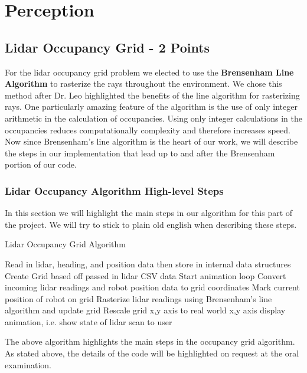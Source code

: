 \documentclass{article}
\numberwithin{equation}{section} %
\numberwithin{figure}{section} %
\numberwithin{table}{section} %
\begin{document}
\section{Perception}

\begin{framed}
\subsection{Lidar Occupancy Grid - 2 Points}
\label{sec:Perception}


For the lidar occupancy grid problem we elected to use the \textbf{Brensenham Line Algorithm} to rasterize the rays throughout the environment.  We chose this method after Dr. Leo highlighted the benefits of the line algorithm for rasterizing rays.  One particularly amazing feature of the algorithm is the use of only integer arithmetic in the calculation of occupancies.  Using only integer calculations in the occupancies reduces computationally complexity and therefore increases speed. Now since Brensenham's line algorithm is the heart of our work, we will describe the steps in our implementation that lead up to and after the Brensenham portion of our code.

\subsubsection{Lidar Occupancy Algorithm High-level Steps}
In this section we will highlight the main steps in our algorithm for this part of the project. We will try to stick to plain old english when describing these steps.

 
\begin{algorithm}[H]
\caption{Lidar Occupancy Grid Algorithm}\label{alg:cap}
\begin{algorithmic}[1] %
\State Read in lidar, heading, and position data then store in internal data structures
\State Create Grid based off passed in lidar CSV data 
\State Start animation loop
\State Convert incoming lidar readings and robot position data to grid coordinates
\State Mark current position of robot on grid 
\State Rasterize lidar readings using Brensenham's line algorithm and update grid
\State Rescale grid x,y axis to real world x,y axis
\State display animation, i.e. show state of lidar scan to user
\EndWhile
\end{algorithmic}
\end{algorithm}

The above algorithm highlights the main steps in the occupancy grid algorithm.  As stated above, the details of the code will be highlighted on request at the oral examination.


\end{framed}
\end{document}
